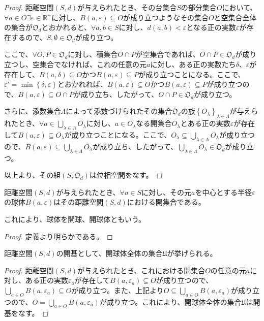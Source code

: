 \documentclass[dvipdfmx]{jsarticle}
\begin{document}
\begin{proof}
距離空間$(S,d)$が与えられたとき、その台集合$S$の部分集合$O$において、$\forall a \in O\exists\varepsilon \in \mathbb{R}^{+}$に対し、$B(a,\varepsilon) \subseteq O$が成り立つようなその集合$O$と空集合全体の集合が$\mathfrak{O}_{d}$とおかれると、$\forall a,b \in S$に対し、$d(a,b) < \varepsilon$となる正の実数$\varepsilon$が存在するので、$S,\emptyset \in \mathfrak{O}_{d}$が成り立つ。\par
ここで、$\forall O,P \in \mathfrak{O}_{d}$に対し、積集合$O \cap P$が空集合であれば、$O \cap P \in \mathfrak{O}_{d}$が成り立つし、空集合でなければ、これの任意の元$a$に対し、ある正の実数たち$\delta$、$\varepsilon$が存在して、$B(a,\delta) \subseteq O$かつ$B(a,\varepsilon) \subseteq P$が成り立つことになる。ここで、$\varepsilon' = \min\left\{ \delta,\varepsilon \right\}$とおかれれば、$B(a,\varepsilon) \subseteq O$かつ$B(a,\varepsilon) \subseteq P$が成り立つので、$B(a,\varepsilon) \subseteq O \cap P$が成り立ち、したがって、$O \cap P \in \mathfrak{O}_{d}$が成り立つ。\par
さらに、添数集合$\varLambda$によって添数づけられたその集合$\mathfrak{O}_{d}$の族$\left\{ O_{\lambda} \right\}_{\lambda \in \varLambda }$が与えられたとき、$\forall a \in \bigcup_{\lambda \in \varLambda} O_{\lambda}$に対し、$a \in O_{\lambda}$なる開集合$O_{\lambda}$とある正の実数$\varepsilon$が存在して$B(a,\varepsilon) \subseteq O_{\lambda}$が成り立つことになる。ここで、$O_{\lambda} \subseteq \bigcup_{\lambda \in \varLambda} O_{\lambda}$が成り立つので、$B(a,\varepsilon) \subseteq \bigcup_{\lambda \in \varLambda} O_{\lambda}$が成り立ち、したがって、$\bigcup_{\lambda \in \varLambda} O_{\lambda} \in \mathfrak{O}_{d}$が成り立つ。\par
以上より、その組$\left( S,\mathfrak{O}_{d} \right)$は位相空間をなす。
\end{proof}
\begin{thm}\label{8.2.1.3}
距離空間$(S,d)$が与えられたとき、$\forall a \in S$に対し、その元$a$を中心とする半径$\varepsilon$の球体$B(a,\varepsilon)$はその距離空間$(S,d)$における開集合である。\end{thm}\par
これにより、球体を開球、開球体ともいう。
\begin{proof} 定義より明らかである。
\end{proof}
\begin{thm}\label{8.2.1.4}
距離空間$(S,d)$の開基として、開球体全体の集合$\mathfrak{U}$が挙げられる。
\end{thm}
\begin{proof}
距離空間$(S,d)$が与えられたとき、これにおける開集合$O$の任意の元$a$に対し、ある正の実数$\varepsilon_{a}$が存在して$B\left( a,\varepsilon_{a} \right) \subseteq O$が成り立つので、$\bigcup_{a \in O} {B\left( a,\varepsilon_{a} \right)} \subseteq O$が成り立つ。また、上記より$O \subseteq \bigcup_{a \in O} {B\left( a,\varepsilon_{a} \right)}$が成り立つので、$O = \bigcup_{a \in O} {B\left( a,\varepsilon_{a} \right)}$が成り立つ。これにより、開球体全体の集合$\mathfrak{U}$は開基をなす。
\end{proof}
\end{document}
